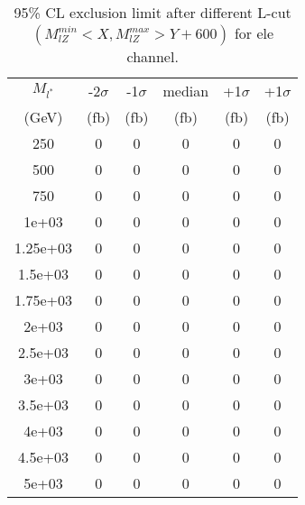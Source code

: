 \documentclass[]{article}
\begin{document}
\begin{table}
\begin{center}
\begin{tabular}{cccccc}
\hline 
\hline 
$M_{l^*}$ & -2$\sigma$ & -1$\sigma$ & median & +1$\sigma$ & +1$\sigma$\\ 
(GeV) & (fb) & (fb) & (fb) & (fb) & (fb)  \\ 
\hline 
\hline 
250 & 0 & 0 & 0 & 0 & 0\\
500 & 0 & 0 & 0 & 0 & 0\\
750 & 0 & 0 & 0 & 0 & 0\\
1e+03 & 0 & 0 & 0 & 0 & 0\\
1.25e+03 & 0 & 0 & 0 & 0 & 0\\
1.5e+03 & 0 & 0 & 0 & 0 & 0\\
1.75e+03 & 0 & 0 & 0 & 0 & 0\\
2e+03 & 0 & 0 & 0 & 0 & 0\\
2.5e+03 & 0 & 0 & 0 & 0 & 0\\
3e+03 & 0 & 0 & 0 & 0 & 0\\
3.5e+03 & 0 & 0 & 0 & 0 & 0\\
4e+03 & 0 & 0 & 0 & 0 & 0\\
4.5e+03 & 0 & 0 & 0 & 0 & 0\\
5e+03 & 0 & 0 & 0 & 0 & 0\\
\hline 
\end{tabular}
\caption{95\% CL exclusion limit after different L-cut $(M_{lZ}^{min} < X, M_{lZ}^{max} > Y + 600)$ for ele channel.}
\label{tab:limit_electron}
\end{center}
\end{table}
\end{document}
